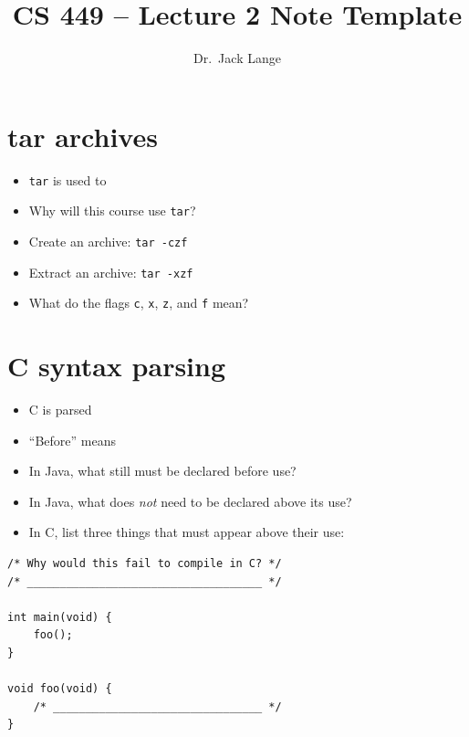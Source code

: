 \documentclass[12pt]{article}
\title{CS 449 -- Lecture 2 Note Template}
\author{Dr.\ Jack Lange}
\date{}
\begin{document}
\maketitle

\section{tar archives}

\begin{itemize}[leftmargin=*]
  \item \texttt{tar} is used to \hrulefill
  \item Why will this course use \texttt{tar}? \hrulefill
  \item Create an archive: \texttt{tar -czf} \hrulefill
  \item Extract an archive: \texttt{tar -xzf} \hrulefill
  \item What do the flags \texttt{c}, \texttt{x}, \texttt{z}, and \texttt{f} mean? \hrulefill
\end{itemize}

\vspace{1.2em}

\section{C syntax parsing}

\begin{itemize}[leftmargin=*]
  \item C is parsed \hrulefill
  \item ``Before'' means \hrulefill
  \item In Java, what still must be declared before use? \hrulefill
  \item In Java, what does \emph{not} need to be declared above its use? \hrulefill
  \item In C, list three things that must appear above their use: \hrulefill
\end{itemize}

\vspace{0.8em}

\begin{lstlisting}
/* Why would this fail to compile in C? */
/* ____________________________________ */

int main(void) {
    foo();
}

void foo(void) {
    /* ________________________________ */
}
\end{lstlisting}
\end{document}
